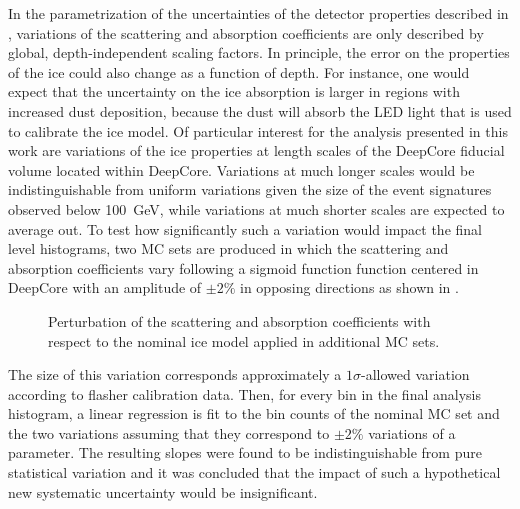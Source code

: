 In the parametrization of the uncertainties of the detector properties described in , variations of the scattering and absorption coefficients are only described by global, depth-independent scaling factors. In principle, the error on the properties of the ice could also change as a function of depth. For instance, one would expect that the uncertainty on the ice absorption is larger in regions with increased dust deposition, because the dust will absorb the LED light that is used to calibrate the ice model. Of particular interest for the analysis presented in this work are variations of the ice properties at length scales of the DeepCore fiducial volume located within DeepCore. Variations at much longer scales would be indistinguishable from uniform variations given the size of the event signatures observed below 100~GeV, while variations at much shorter scales are expected to average out. To test how significantly such a variation would impact the final level histograms, two MC sets are produced in which the scattering and absorption coefficients vary following a sigmoid function function centered in DeepCore with an amplitude of $\pm 2\%$ in opposing directions as shown in .
\begin{figure}
    \centering
    \caption{Perturbation of the scattering and absorption coefficients with respect to the nominal ice model applied in additional MC sets.}
    \label{fig:step-function-ice-model}
\end{figure}
The size of this variation corresponds approximately a $1\sigma$-allowed variation according to flasher calibration data. Then, for every bin in the final analysis histogram, a linear regression is fit to the bin counts of the nominal MC set and the two variations assuming that they correspond to $\pm 2\%$ variations of a parameter. The resulting slopes were found to be indistinguishable from pure statistical variation and it was concluded that the impact of such a hypothetical new systematic uncertainty would be insignificant.


